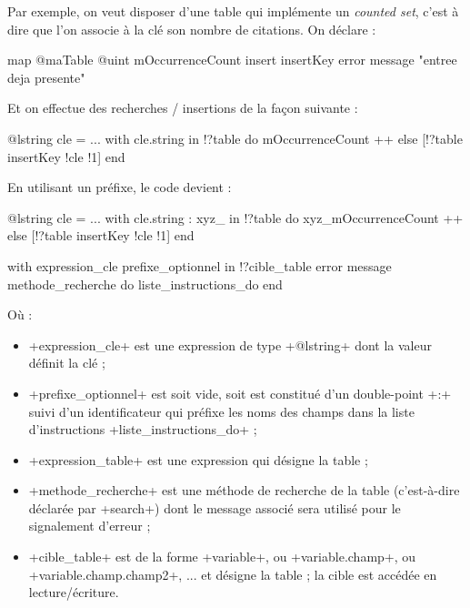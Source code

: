 Par exemple, on veut disposer d'une table qui implémente un \emph{counted set}, c'est à dire que l'on associe à la clé son nombre de citations. On déclare :
\begin{galgas}
map @maTable {
  @uint mOccurrenceCount
  insert insertKey error message "entree deja presente"
}
\end{galgas}

Et on effectue des recherches / insertions de la façon suivante :
\begin{galgas}
@lstring cle = ...
with cle.string in !?table do
  mOccurrenceCount ++
else
  [!?table insertKey !cle !1]
end
\end{galgas}

En utilisant un préfixe, le code devient :
\begin{galgas}
@lstring cle = ...
with cle.string : xyz_ in !?table do
  xyz_mOccurrenceCount ++
else
  [!?table insertKey !cle !1]
end
\end{galgas}





\begin{galgas}
with expression_cle prefixe_optionnel in !?cible_table
error message methode_recherche
do
  liste_instructions_do
end
\end{galgas}

Où :
\begin{itemize}
  \item \ggs+expression_cle+ est une expression de type \ggs+@lstring+ dont la valeur définit la clé ;
  \item \ggs+prefixe_optionnel+ est soit vide, soit est constitué d'un double-point \ggs+:+ suivi d'un identificateur qui préfixe les noms des champs dans la liste d'instructions \ggs+liste_instructions_do+ ;
  \item \ggs+expression_table+ est une expression qui désigne la table ;
  \item \ggs+methode_recherche+ est une méthode de recherche de la table (c'est-à-dire déclarée par \ggs+search+) dont le message associé sera utilisé pour le signalement d'erreur ;
  \item \ggs+cible_table+ est de la forme \ggs+variable+, ou  \ggs+variable.champ+, ou \ggs+variable.champ.champ2+, ... et désigne la table ; la cible est accédée en lecture/écriture.
\end{itemize}

